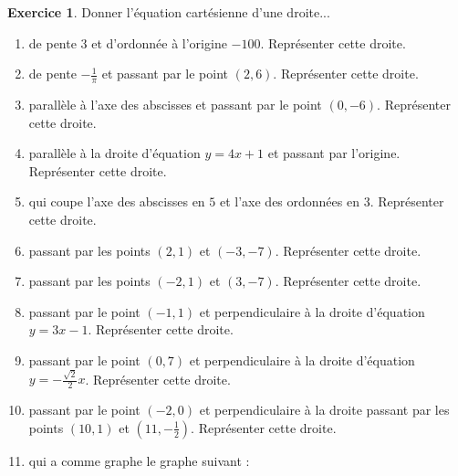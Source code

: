 \documentclass[a4paper,13pt]{scrreprt}
\theoremstyle{plain}
\theoremstyle{definition}
\newtheorem{exo}[subsection]{Exercice}
\begin{document}
\begin{exo} \label{exop5}
	Donner l'équation cartésienne d'une droite...
	\begin{enumerate}
		\item de pente $3$ et d'ordonnée à l'origine $-100$. Représenter cette droite.
		\item de pente $-\frac{1}{\pi}$ et passant par le point $(2,6)$. Représenter cette droite.
		\item parallèle à l'axe des abscisses et passant par le point $(0,-6)$. Représenter cette droite.
		\item parallèle à la droite d'équation $y=4x+1$ et passant par l'origine. Représenter cette droite.
		\item qui coupe l'axe des abscisses en $5$ et l'axe des ordonnées en $3$. Représenter cette droite.
		\item passant par les points $(2,1)$ et $(-3,-7)$. Représenter cette droite.
		\item passant par les points $(-2,1)$ et $(3,-7)$. Représenter cette droite.
		\item passant par le point $(-1,1)$ et perpendiculaire à la droite d'équation $y=3x-1$. Représenter cette droite.
		\item passant par le point $(0,7)$ et perpendiculaire à la droite d'équation $y=-\frac{\sqrt{2}}{2}x$. Représenter cette droite.
		\item passant par le point $(-2,0)$ et perpendiculaire à la droite passant par les points $(10,1)$ et $(11,-\frac{1}{2})$. Représenter cette droite.
		\item qui a comme graphe le graphe suivant :
		\begin{center}
		\end{center}
	\end{enumerate}
\end{exo}
\end{document}

